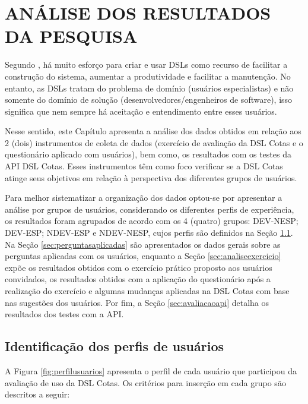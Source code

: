 \chapter{ANÁLISE DOS RESULTADOS DA  PESQUISA}
\label{chap:analise}

Segundo , há muito esforço para criar e usar \gls{DSL}s como recurso de facilitar a construção do sistema, aumentar a produtividade e facilitar a manutenção. No entanto, as \gls{DSL}s tratam do problema de domínio (usuários especialistas) e não somente do domínio de solução (desenvolvedores/engenheiros de software), isso significa que nem sempre há aceitação e entendimento entre esses usuários.

Nesse sentido, este Capítulo apresenta a análise dos dados obtidos em relação aos 2 (dois) instrumentos de coleta de dados (exercício de avaliação da DSL Cotas e o questionário aplicado com usuários), bem como, os resultados com os testes da API DSL Cotas. Esses instrumentos têm como foco verificar se a DSL Cotas atinge seus objetivos em relação à perspectiva dos diferentes grupos de usuários. 

Para melhor sistematizar a organização dos dados optou-se por apresentar a análise por grupos de usuários, considerando os diferentes perfis de experiência, os resultados foram agrupados de acordo com os 4 (quatro) grupos:  DEV-NESP; DEV-ESP; NDEV-ESP e NDEV-NESP, cujos perfis são definidos na Seção \ref{sec:idperfis}. Na Seção \ref{sec:perguntasaplicadas} são apresentados os dados gerais sobre as perguntas aplicadas com os usuários, enquanto a Seção \ref{sec:analiseexercicio} expõe os resultados obtidos com o exercício prático proposto aos usuários convidados, os resultados obtidos com a aplicação do questionário após a realização do exercício e algumas mudanças aplicadas na DSL Cotas com base nas sugestões dos usuários. Por fim, a Seção \ref{sec:avaliacaoapi} detalha os resultados dos testes com a API.





\section{Identificação dos perfis de usuários}
\label{sec:idperfis}


A Figura \ref{fig:perfilusuarios} apresenta o perfil de cada usuário que participou da avaliação de uso da DSL Cotas. Os critérios para inserção em cada grupo são descritos a seguir:


